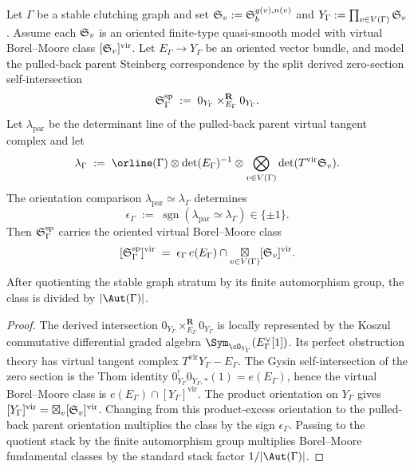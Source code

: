 \begin{theorem}
\label{thm:split-finite-steinberg-virtual-class}
Let $\Gamma$ be a stable clutching graph and set
$\mathfrak{S}_v:=\mathfrak{S}_b^{g(v),n(v)}$ and
$Y_\Gamma:=\prod_{v\in V(\Gamma)}\mathfrak{S}_v$. Assume each
$\mathfrak{S}_v$ is an oriented finite-type quasi-smooth model with virtual
Borel--Moore class $[\mathfrak{S}_v]^{\mathrm{vir}}$. Let
$E_\Gamma\to Y_\Gamma$ be an oriented vector bundle, and model the
pulled-back parent Steinberg correspondence by the split derived
zero-section self-intersection
\begin{equation}
\label{eq:split-steinberg-model}
\mathfrak{S}_\Gamma^{\mathrm{sp}}
\;:=\;
0_{Y_\Gamma}\times^{\mathbf R}_{E_\Gamma}0_{Y_\Gamma}.
\end{equation}
Let $\lambda_{\mathrm{par}}$ be the determinant line of the pulled-back
parent virtual tangent complex and let
\[
\lambda_\Gamma
\;:=\;
\orline(\Gamma)\otimes \det(E_\Gamma)^{-1}
\otimes
\bigotimes_{v\in V(\Gamma)}
\det(T^{\mathrm{vir}}\fS_v).
\]
The orientation comparison
$\lambda_{\mathrm{par}}\simeq\lambda_\Gamma$ determines
\[
\epsilon_\Gamma
\;:=\;
\operatorname{sgn}(\lambda_{\mathrm{par}}\simeq\lambda_\Gamma)
\in\{\pm1\}.
\]
Then $\mathfrak{S}_\Gamma^{\mathrm{sp}}$ carries the oriented virtual
Borel--Moore class
\begin{equation}
\label{eq:split-steinberg-virtual-class}
[\mathfrak{S}_\Gamma^{\mathrm{sp}}]^{\mathrm{vir}}
\;=\;
\epsilon_\Gamma\,
e(E_\Gamma)\cap
\mathop{\boxtimes}\limits_{v\in V(\Gamma)}
[\mathfrak{S}_v]^{\mathrm{vir}}.
\end{equation}
After quotienting the stable graph stratum by its finite automorphism
group, the class is divided by $|\Aut(\Gamma)|$.
\end{theorem}

\begin{proof}
The derived intersection
$0_{Y_\Gamma}\times^{\mathbf R}_{E_\Gamma}0_{Y_\Gamma}$ is locally
represented by the Koszul commutative differential graded algebra
$\Sym_{\cO_{Y_\Gamma}}(E_\Gamma^\vee[1])$. Its perfect obstruction
theory has virtual tangent complex
$T^{\mathrm{vir}}Y_\Gamma-E_\Gamma$. The Gysin self-intersection of
the zero section is the Thom identity
$0_{Y_\Gamma}^{!}0_{Y_\Gamma,*}(1)=e(E_\Gamma)$, hence the virtual
Borel--Moore class is
$e(E_\Gamma)\cap[Y_\Gamma]^{\mathrm{vir}}$. The product orientation on
$Y_\Gamma$ gives
$[Y_\Gamma]^{\mathrm{vir}}=\boxtimes_v[\mathfrak{S}_v]^{\mathrm{vir}}$.
Changing from this product-excess orientation to the pulled-back parent
orientation multiplies the class by the sign
$\epsilon_\Gamma$. Passing to the quotient stack by the finite
automorphism group multiplies Borel--Moore fundamental classes by the
standard stack factor $1/|\Aut(\Gamma)|$.
\end{proof}

